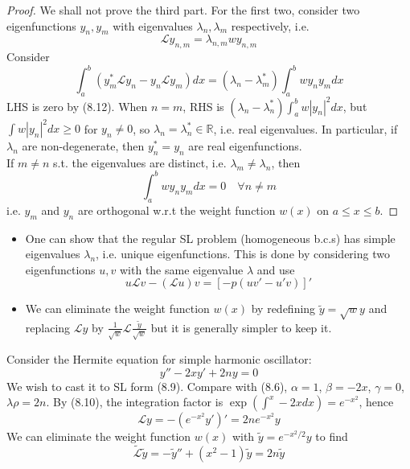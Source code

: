 \documentclass[a4paper]{article}
\begin{document}
\begin{proof}
We shall not prove the third part. For the first two, consider two eigenfunctions $y_n,y_m$ with eigenvalues $\lambda_n,\lambda_m$ respectively, i.e.
\begin{equation}
    \mathcal{L} y_{n,m}=\lambda_{n,m}wy_{n,m}\tag{8.12}
\end{equation}
Consider
$$\int_a^b(y_m^*\mathcal{L}y_n-y_n\mathcal{L}y_m)dx=(\lambda_n-\lambda_m^*)\int_a^bwy_ny_mdx$$
LHS is zero by (8.12). When $n=m$, RHS is $(\lambda_n-\lambda_n^*)\int_a^bw|y_n|^2dx$, but $\int w|y_n|^2dx\geq0$ for $y_n\neq 0$, so $\lambda_n=\lambda_n^*\in\mathbb{R}$, i.e. real eigenvalues. In particular, if $\lambda_n$ are non-degenerate, then $y_n^*=y_n$ are real eigenfunctions.\\[5pt]
If $m\neq n$ s.t. the eigenvalues are distinct, i.e. $\lambda_m\neq\lambda_n$, then \begin{equation}
     \int_a^bwy_ny_mdx=0\quad\forall n\neq m\tag{8.13}
\end{equation}
i.e. $y_m$ and $y_n$ are orthogonal w.r.t the weight function $w(x)$ on $a\leq x\leq b$.
\end{proof}
\begin{remarks}\leavevmode
\begin{itemize}
    \item One can show that the regular SL problem (homogeneous b.c.s) has simple eigenvalues $\lambda_n$, i.e. unique eigenfunctions. This is done by considering two eigenfunctions $u,v$ with the same eigenvalue $\lambda$ and use
    $$u\mathcal{L}v-(\mathcal{L}u)v=[-p(uv'-u'v)]'$$
    \item We can eliminate the weight function $w(x)$ by redefining $\tilde{y}=\sqrt{w}y$ and replacing $\mathcal{L}y$ by $\frac{1}{\sqrt{w}}\mathcal{L}\frac{\tilde{y}}{\sqrt{w}}$ but it is generally simpler to keep it.
\end{itemize}
\end{remarks}
\begin{eg}
Consider the Hermite equation for simple harmonic oscillator:
$$y''-2xy'+2ny=0$$
We wish to cast it to SL form (8.9). Compare with (8.6), $\alpha=1$, $\beta=-2x$, $\gamma=0$, $\lambda\rho=2n$. By (8.10), the integration factor is $\exp(\int^x-2xdx)=e^{-x^2}$, hence
\begin{equation}
    \mathcal{L}y=-(e^{-x^2}y')'=2ne^{-x^2}y\tag{8.13}
\end{equation}
We can eliminate the weight function $w(x)$ with $\tilde{y}=e^{-x^2/2}y$ to find
$$\tilde{\mathcal{L}}\tilde{y}=-\tilde{y}''+(x^2-1)\tilde{y}=2n\tilde{y}$$
\end{eg}
\end{document}
